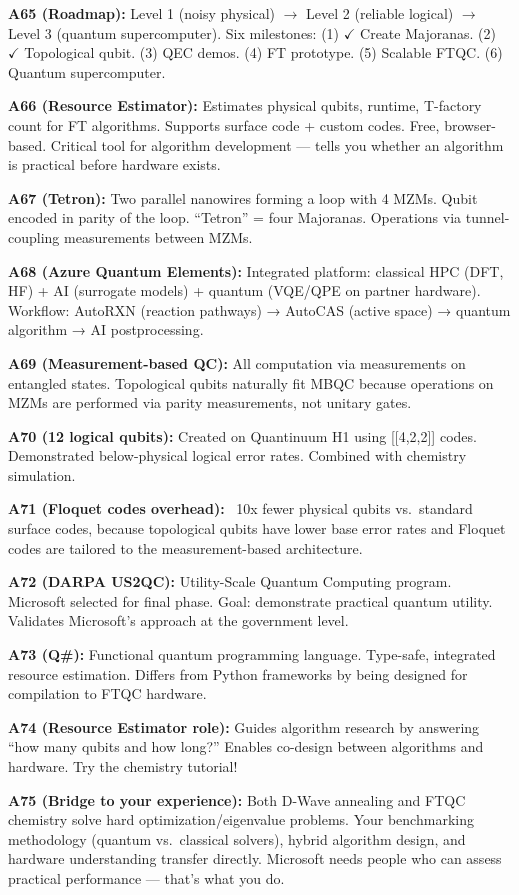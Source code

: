 \documentclass[11pt,a4paper]{article}
\begin{document}
\begin{answerbox}
\textbf{A65 (Roadmap):} Level 1 (noisy physical) $\to$ Level 2 (reliable logical) $\to$ Level 3 (quantum supercomputer). Six milestones: (1) $\checkmark$ Create Majoranas. (2) $\checkmark$ Topological qubit. (3) QEC demos. (4) FT prototype. (5) Scalable FTQC. (6) Quantum supercomputer.

\textbf{A66 (Resource Estimator):} Estimates physical qubits, runtime, T-factory count for FT algorithms. Supports surface code + custom codes. Free, browser-based. Critical tool for algorithm development --- tells you whether an algorithm is practical before hardware exists.

\textbf{A67 (Tetron):} Two parallel nanowires forming a loop with 4 MZMs. Qubit encoded in parity of the loop. ``Tetron'' = four Majoranas. Operations via tunnel-coupling measurements between MZMs.

\textbf{A68 (Azure Quantum Elements):} Integrated platform: classical HPC (DFT, HF) + AI (surrogate models) + quantum (VQE/QPE on partner hardware). Workflow: AutoRXN (reaction pathways) → AutoCAS (active space) → quantum algorithm → AI postprocessing.

\textbf{A69 (Measurement-based QC):} All computation via measurements on entangled states. Topological qubits naturally fit MBQC because operations on MZMs are performed via parity measurements, not unitary gates.

\textbf{A70 (12 logical qubits):} Created on Quantinuum H1 using [[4,2,2]] codes. Demonstrated below-physical logical error rates. Combined with chemistry simulation.

\textbf{A71 (Floquet codes overhead):} ~10x fewer physical qubits vs.\ standard surface codes, because topological qubits have lower base error rates and Floquet codes are tailored to the measurement-based architecture.

\textbf{A72 (DARPA US2QC):} Utility-Scale Quantum Computing program. Microsoft selected for final phase. Goal: demonstrate practical quantum utility. Validates Microsoft's approach at the government level.

\textbf{A73 (Q\#):} Functional quantum programming language. Type-safe, integrated resource estimation. Differs from Python frameworks by being designed for compilation to FTQC hardware.

\textbf{A74 (Resource Estimator role):} Guides algorithm research by answering ``how many qubits and how long?'' Enables co-design between algorithms and hardware. Try the chemistry tutorial!

\textbf{A75 (Bridge to your experience):} Both D-Wave annealing and FTQC chemistry solve hard optimization/eigenvalue problems. Your benchmarking methodology (quantum vs.\ classical solvers), hybrid algorithm design, and hardware understanding transfer directly. Microsoft needs people who can assess practical performance --- that's what you do.
\end{answerbox}
\end{document}
